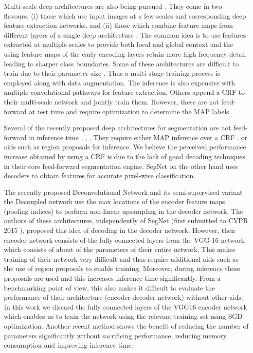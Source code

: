 \documentclass[10pt,journal,compsoc]{IEEEtran}
\begin{document}
Multi-scale deep architectures are also being pursued \cite{eigen2015predicting,lin2015efficient}. They come in two flavours, (i) those which use input images at a few scales and corresponding deep feature extraction networks, and (ii) those which combine feature maps from different layers of a single deep architecture \cite{hariharan2015hypercolumns} \cite{ParseNetRabinovich}. The common idea is to use features extracted at multiple scales to provide both local and global context \cite{mostajabi2015feedforward} and the using feature maps of the early encoding layers retain more high frequency detail leading to sharper class boundaries. Some of these architectures are difficult to train due to their parameter size \cite{eigen2015predicting}. Thus a multi-stage training process is employed along with data augmentation. The inference is also expensive with multiple convolutional pathways for feature extraction. Others \cite{lin2015efficient} append a CRF to their multi-scale network and jointly train them. However, these are not feed-forward at test time and require optimization to determine the MAP labels.

Several of the recently proposed deep architectures for segmentation are not feed-forward in inference time \cite{noh2015learning}, \cite{liang2015semantic}, \cite{hong2015decoupled}. They require either MAP inference over a CRF \cite{lin2015efficient}, \cite{UrtasunSegmentation} or aids such as region proposals \cite{noh2015learning} for inference. We believe the perceived performance increase obtained by using a CRF is due to the lack of good decoding techniques in their core feed-forward segmentation engine. SegNet on the other hand uses decoders to obtain features for accurate pixel-wise classification.

The recently proposed Deconvolutional Network \cite{noh2015learning} and its semi-supervised variant the Decoupled network \cite{hong2015decoupled} use the max locations of the encoder feature maps (pooling indices) to perform non-linear upsampling in the decoder network. The authors of these architectures, independently of SegNet (first submitted to CVPR 2015 \cite{SegNetarXiv}), proposed this idea of decoding in the decoder network. However, their encoder network consists of the fully connected layers from the VGG-16 network which consists of about  of the parameters of their entire network. This makes training of their network very difficult and thus require additional aids such as the use of region proposals to enable training. Moreover, during inference these proposals are used and this increases inference time  significantly. From a benchmarking point of view, this also makes it difficult to evaluate the performance of their architecture (encoder-decoder network) without other aids. In this work we discard the fully connected layers of the VGG16 encoder network which enables us to train the network using the relevant training set using SGD optimization. Another recent method \cite{liang2015semantic} shows the benefit of reducing the number of parameters significantly without sacrificing performance, reducing memory consumption and improving inference time. 
\end{document}
